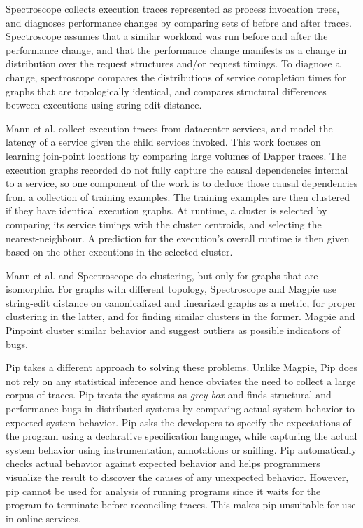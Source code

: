 Spectroscope \cite{Sambasivan:2011:DPC:1972457.1972463} collects execution traces represented as process invocation trees, and diagnoses performance
changes by comparing sets of before and after traces. Spectroscope assumes that a similar workload was run before and after the performance change, and that the performance change manifests as a change in distribution
over the request structures and/or request timings. To diagnose a change, spectroscope compares the distributions of service completion times for graphs that are topologically identical, and compares structural differences
between executions using string-edit-distance.

Mann et al. \cite{Mann:2011:MPE:2170444.2170464} collect execution traces from datacenter services, and model the latency of a service given the child services invoked.
This work focuses on learning join-point locations by comparing large volumes of Dapper traces.
The execution graphs recorded do not fully capture the causal dependencies internal to a service, so one component of the work is to deduce those causal dependencies from a collection of training examples.
The training examples are then clustered if they have identical execution graphs. 
At runtime, a cluster is selected by comparing its service timings with the cluster centroids, and selecting the nearest-neighbour. 
A prediction for the execution’s overall runtime is then given based on the other executions in the selected cluster.

Mann et al. and Spectroscope do clustering, but only for graphs that are isomorphic.
For graphs with different topology, Spectroscope and Magpie use string-edit distance on canonicalized and linearized graphs as a metric,
for proper clustering in the latter, and for finding similar clusters in the former.
Magpie and Pinpoint cluster similar behavior and suggest outliers as possible indicators of bugs.

Pip \cite{Reynolds2006PipDT} takes a different approach to solving these problems. 
Unlike Magpie, Pip does not rely on any statistical inference and hence obviates the need to collect a large corpus of traces.
Pip treats the systems as \textit{grey-box} and finds structural and performance bugs in distributed systems by comparing actual system behavior to expected system behavior.
Pip asks the developers to specify the expectations of the program using a declarative specification language, while capturing the actual system behavior using instrumentation, annotations or sniffing.
Pip automatically checks actual behavior against expected behavior and helps programmers visualize the result to discover the causes of any unexpected behavior.
However, pip cannot be used for analysis of running programs since it waits for the program to terminate before reconciling traces. 
This makes pip unsuitable for use in online services. 

